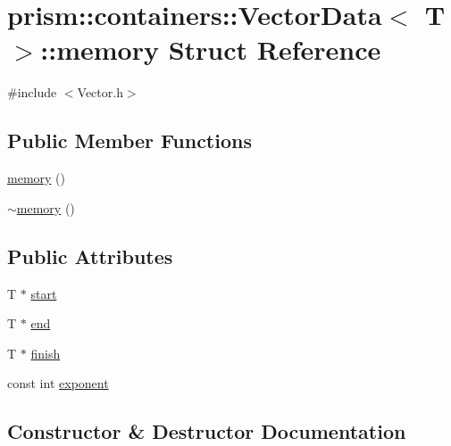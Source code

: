 \hypertarget{structprism_1_1containers_1_1_vector_data_1_1memory}{}\section{prism\+:\+:containers\+:\+:Vector\+Data$<$ T $>$\+:\+:memory Struct Reference}
\label{structprism_1_1containers_1_1_vector_data_1_1memory}


{\ttfamily \#include $<$Vector.\+h$>$}

\subsection*{Public Member Functions}
\begin{DoxyCompactItemize}
\item 
\hyperlink{structprism_1_1containers_1_1_vector_data_1_1memory_a14af9827ce763c894ad68bc9c9009ad7}{memory} ()
\item 
\hyperlink{structprism_1_1containers_1_1_vector_data_1_1memory_a6b91e75bd65215938fe75e3ba30dc51e}{$\sim$memory} ()
\end{DoxyCompactItemize}
\subsection*{Public Attributes}
\begin{DoxyCompactItemize}
\item 
T $\ast$ \hyperlink{structprism_1_1containers_1_1_vector_data_1_1memory_af3f72d7433538e3fa6cd64e014901df8}{start}
\item 
T $\ast$ \hyperlink{structprism_1_1containers_1_1_vector_data_1_1memory_a0137f641767b988652650d1a9ef7a8d9}{end}
\item 
T $\ast$ \hyperlink{structprism_1_1containers_1_1_vector_data_1_1memory_a96fc012185f1c540d036479500e8b922}{finish}
\item 
const int \hyperlink{structprism_1_1containers_1_1_vector_data_1_1memory_a454a3d72e1450abecdf70f747418f0d8}{exponent}
\end{DoxyCompactItemize}


\subsection{Constructor \& Destructor Documentation}
